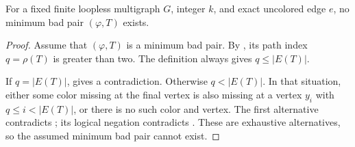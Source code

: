 \begin{lemma}
For a fixed finite loopless multigraph \(G\), integer \(k\), and exact
uncolored edge \(e\), no minimum bad pair \((\varphi,T)\) exists.
\end{lemma}
\begin{proof}
Assume that \((\varphi,T)\) is a minimum bad pair.  By
, its path index \(q=\rho(T)\) is
greater than two.  The definition  always gives
\(q\le |E(T)|\).

If \(q=|E(T)|\),  gives a
contradiction.  Otherwise \(q<|E(T)|\).  In that situation, either some
color missing at the final vertex is also missing at a vertex \(y_i\) with
\(q\le i<|E(T)|\), or there is no such color and vertex.  The first
alternative contradicts ; its logical
negation contradicts .  These are
exhaustive alternatives, so the assumed minimum bad pair cannot exist.
\end{proof}
